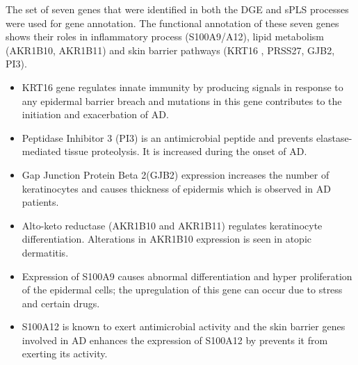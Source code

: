 \documentclass[journal, a4paper]{IEEEtran}
\begin{document}

The set of seven genes that were identified in both the DGE and sPLS processes were used for gene annotation. The functional annotation of these seven genes shows their roles in inflammatory process (S100A9/A12), lipid metabolism (AKR1B10, AKR1B11) and skin barrier pathways (KRT16 , PRSS27, GJB2, PI3).

\begin{itemize}
  \item KRT16 gene regulates innate immunity by producing signals in response to any epidermal barrier breach and mutations in this gene contributes to the initiation and exacerbation of AD\cite{meyer2012epidermal, hello2016atopic}.
  \item Peptidase Inhibitor 3 (PI3) is an antimicrobial peptide and prevents elastase-mediated tissue proteolysis. It is increased during the onset of AD\cite{mansouri2015immune}.
  \item Gap Junction Protein Beta 2(GJB2) expression increases the number of keratinocytes and causes thickness of epidermis which is observed in AD patients\cite{suriyaphol2014association}.
  \item Alto-keto reductase (AKR1B10 and AKR1B11) regulates keratinocyte differentiation. Alterations in AKR1B10 expression is seen in atopic dermatitis\cite{ghosh2015multiple, gao2017combined}.
  \item Expression of S100A9 causes abnormal differentiation and hyper proliferation of the epidermal cells; the upregulation of this gene can occur due to stress and certain drugs\cite{kerkhoff2012novel}.
  \item S100A12 is known to exert antimicrobial activity and the skin barrier genes involved in AD enhances the expression of S100A12 by prevents it from exerting its activity\cite{mikus2019antimicrobial}.\\
\end{itemize}
\end{document}
